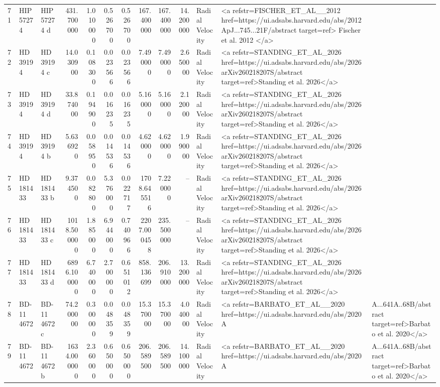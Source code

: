 \begin{tabular}{lllrrrrrrrll}
71 & HIP 57274 & HIP 57274 d & 431.700000 & 1.010000 & 0.526700 & 0.526700 & 167.400000 & 167.400000 & 14.200000 & Radial Velocity & <a refstr=FISCHER_ET_AL__2012 href=https://ui.adsabs.harvard.edu/abs/2012ApJ...745...21F/abstract target=ref> Fischer et al. 2012 </a> \\
72 & HD 39194 & HD 39194 c & 14.030900 & 0.108300 & 0.023566 & 0.023566 & 7.490000 & 7.490000 & 2.650000 & Radial Velocity & <a refstr=STANDING_ET_AL_2026 href=https://ui.adsabs.harvard.edu/abs/2026arXiv260218207S/abstract target=ref>Standing et al. 2026</a> \\
73 & HD 39194 & HD 39194 d & 33.874000 & 0.194900 & 0.016235 & 0.016235 & 5.160000 & 5.160000 & 2.120000 & Radial Velocity & <a refstr=STANDING_ET_AL_2026 href=https://ui.adsabs.harvard.edu/abs/2026arXiv260218207S/abstract target=ref>Standing et al. 2026</a> \\
74 & HD 39194 & HD 39194 b & 5.636920 & 0.058950 & 0.014536 & 0.014536 & 4.620000 & 4.620000 & 1.990000 & Radial Velocity & <a refstr=STANDING_ET_AL_2026 href=https://ui.adsabs.harvard.edu/abs/2026arXiv260218207S/abstract target=ref>Standing et al. 2026</a> \\
75 & HD 181433 & HD 181433 b & 9.374500 & 0.082800 & 5.376000 & 0.022717 & 1708.645516 & 7.220000 & -- & Radial Velocity & <a refstr=STANDING_ET_AL_2026 href=https://ui.adsabs.harvard.edu/abs/2026arXiv260218207S/abstract target=ref>Standing et al. 2026</a> \\
76 & HD 181433 & HD 181433 c & 1018.500000 & 1.885000 & 6.944000 & 0.740966 & 2207.000458 & 235.500000 & -- & Radial Velocity & <a refstr=STANDING_ET_AL_2026 href=https://ui.adsabs.harvard.edu/abs/2026arXiv260218207S/abstract target=ref>Standing et al. 2026</a> \\
77 & HD 181433 & HD 181433 d & 6896.100000 & 6.740000 & 2.700000 & 0.651012 & 858.136699 & 206.910000 & 13.200000 & Radial Velocity & <a refstr=STANDING_ET_AL_2026 href=https://ui.adsabs.harvard.edu/abs/2026arXiv260218207S/abstract target=ref>Standing et al. 2026</a> \\
78 & BD-11 4672 & BD-11 4672 c & 74.200000 & 0.300000 & 0.048359 & 0.048359 & 15.370000 & 15.370000 & 4.040000 & Radial Velocity & <a refstr=BARBATO_ET_AL__2020 href=https://ui.adsabs.harvard.edu/abs/2020A&A...641A..68B/abstract target=ref>Barbato et al. 2020</a> \\
79 & BD-11 4672 & BD-11 4672 b & 1634.000000 & 2.360000 & 0.650000 & 0.650000 & 206.589500 & 206.589500 & 14.100000 & Radial Velocity & <a refstr=BARBATO_ET_AL__2020 href=https://ui.adsabs.harvard.edu/abs/2020A&A...641A..68B/abstract target=ref>Barbato et al. 2020</a> \\

\end{tabular}
